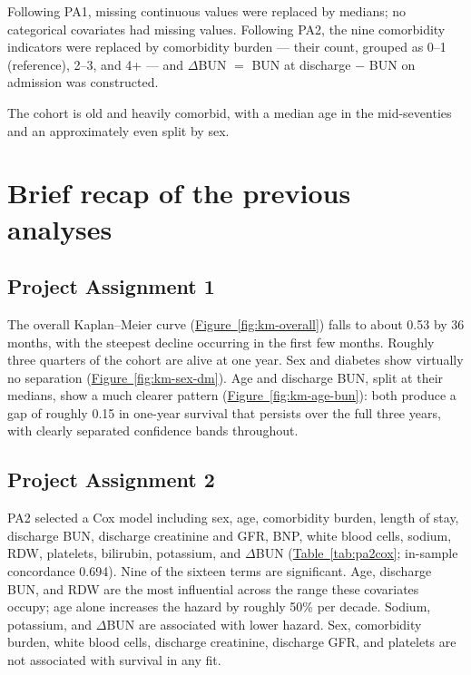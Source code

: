 \documentclass[11pt,a4paper]{article}
\newcommand{\tabref}[1]{\hyperref[#1]{Table~\ref*{#1}}}
\newcommand{\figref}[1]{\hyperref[#1]{Figure~\ref*{#1}}}
\newcommand{\dbun}{$\Delta$BUN}
\begin{document}
Following PA1, missing continuous values were replaced by medians; no categorical covariates had missing values. Following PA2, the nine comorbidity indicators were replaced by comorbidity burden --- their count, grouped as 0--1 (reference), 2--3, and 4+ --- and \dbun{} $=$ BUN at discharge $-$ BUN on admission was constructed.

The cohort is old and heavily comorbid, with a median age in the mid-seventies and an approximately even split by sex. 


\section{Brief recap of the previous analyses}

\subsection{Project Assignment 1}

The overall Kaplan--Meier curve (\figref{fig:km-overall}) falls to about 0.53 by 36 months, with the steepest decline occurring in the first few months. Roughly three quarters of the cohort are alive at one year. Sex and diabetes show virtually no separation (\figref{fig:km-sex-dm}). Age and discharge BUN, split at their medians, show a much clearer pattern (\figref{fig:km-age-bun}): both produce a gap of roughly 0.15 in one-year survival that persists over the full three years, with clearly separated confidence bands throughout.

\subsection{Project Assignment 2}

PA2 selected a Cox model including sex, age, comorbidity burden, length of stay, discharge BUN, discharge creatinine and GFR, BNP, white blood cells, sodium, RDW, platelets, bilirubin, potassium, and \dbun{} (\tabref{tab:pa2cox}; in-sample concordance 0.694). Nine of the sixteen terms are significant. Age, discharge BUN, and RDW are the most influential across the range these covariates occupy; age alone increases the hazard by roughly 50\% per decade. Sodium, potassium, and \dbun{} are associated with lower hazard. Sex, comorbidity burden, white blood cells, discharge creatinine, discharge GFR, and platelets are not associated with survival in any fit.
\end{document}
